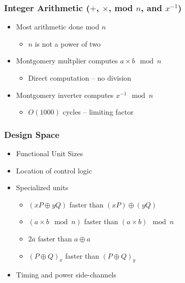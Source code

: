 \documentclass{beamer}
\begin{document}
\begin{frame}
  \frametitle{Integer Arithmetic ($+$, $\times$, mod $n$, and $x^{-1}$)}

  \begin{itemize}
  \item Most arithmetic done mod $n$
    \begin{itemize}
    \item $n$ is not a power of two
    \end{itemize}
  \item Montgomery multplier computes $a\times b\mod n$
    \begin{itemize}
    \item Direct computation -- no division
    \end{itemize}
  \item Montgomery inverter computes $x^{-1}\mod n$
    \begin{itemize}
    \item $O(1000)$ cycles -- limiting factor
    \end{itemize}
  \end{itemize}
\end{frame}

\begin{frame}
  \frametitle{Design Space}

  \begin{itemize}
  \item Functional Unit Sizes
  \item Location of control logic
  \item Specialized units
    \begin{itemize}
    \item $(xP \oplus yQ)$ faster than $(xP) \oplus (yQ)$
    \item $(a \times b \mod n)$ faster than $(a\times b)\mod n$
    \item $2a$ faster than $a \oplus a$
    \item $(P \oplus Q)_x$ faster than $(P\oplus Q)_y$
    \end{itemize}
  \item Timing and power side-channels
  \end{itemize}
\end{frame}
\end{document}
